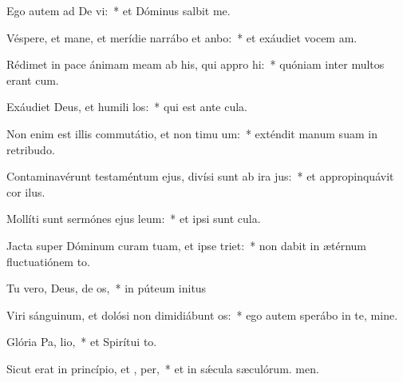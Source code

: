 \item Ego autem ad De vi:~* et Dóminus salbit me.
\item Véspere, et mane, et merídie narrábo et anbo:~* et exáudiet vocem am.
\item Rédimet in pace ánimam meam ab his, qui appro hi:~* quóniam inter multos erant cum.
\item Exáudiet Deus, et humili los:~* qui est ante cula.
\item Non enim est illis commutátio, et non timu um:~* exténdit manum suam in retribudo.
\item Contaminavérunt testaméntum ejus, divísi sunt ab ira  jus:~* et appropinquávit cor ilus.
\item Mollíti sunt sermónes ejus  leum:~* et ipsi sunt cula.
\item Jacta super Dóminum curam tuam, et ipse  triet:~* non dabit in ætérnum fluctuatiónem to.
\item Tu vero, Deus, de os,~* in púteum initus
\item Viri sánguinum, et dolósi non dimidiábunt  os:~* ego autem sperábo in te, mine.
\item Glória Pa,  lio,~* et Spirítui to.
\item Sicut erat in princípio, et ,  per,~* et in sǽcula sæculórum. men.
